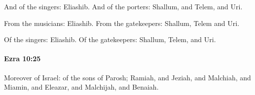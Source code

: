 			\begin{versebox}
					\item[BHS] 
					\item[LXX] 
					\item[ASV] And of the singers: Eliashib. And of the porters: Shallum, and Telem, and Uri.
					\item[NIV] From the musicians: Eliashib. From the gatekeepers: Shallum, Telem and Uri.
					\item[NRSV] Of the singers: Eliashib. Of the gatekeepers: Shallum, Telem, and Uri.
			\end{versebox}

		\paragraph{Ezra 10:25} %
			\label{EZRA-10-25}

			Moreover of Israel: of the sons of Parosh; Ramiah, and Jeziah, and Malchiah, and Miamin, and Eleazar, and Malchijah, and Benaiah.

